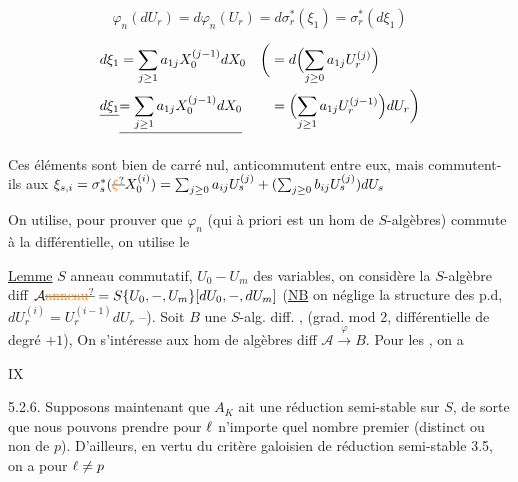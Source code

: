 \[
\varphi_n(dU_r)=d\varphi_n(U_r)=d\sigma_r^*(\xi_1)=\sigma_r^*(d\xi_1)
\]

\[
\begin{aligned}
 d\xi_1&=\sum_{j\geq1}a_{1j}X_0^{(j-1)}dX_0
 &\biggl(&=d\Bigl(\sum_{j\geq0}a_{1j}U_r^{(j)}\Bigr)\\
 \deleted{d\xi_1}&\deleted{=\sum_{j\geq1}a_{1j}X_0^{(j-1)}dX_0}
 &&=\Bigl(\sum_{j\geq1}a_{1j}U_r^{(j-1)}\Bigr)dU_r\biggr)
\end{aligned}
\]

Ces éléments sont bien de carré nul, anticommutent entre eux, mais commutent-ils aux $\xi_{s,i}=\sigma_s^*(\deleted{\unsure{\xi}}X_0^{(i)})=\sum_{j\geq0}a_{ij}U_s^{(j)}+(\sum_{j\geq0}b_{ij}U_s^{(j)})dU_s$



On utilise, pour prouver que $\varphi_n$ (qui à priori est un hom de $S$-algèbres) commute à la différentielle, on utilise le

\uline{Lemme} $S$ anneau commutatif, $U_0-U_m$ des variables, on considère la $S$-algèbre diff $\mathcal A\deleted{\unsure{\text{anneau}}}=S\{U_0,-,U_m\}[dU_0,-,dU_m]$ (\uline{NB} on néglige la structure des p.d,  $dU_r^{(i)}=U_r^{(i-1)}dU_r$ --). Soit $B$ une $S$-alg. diff. , (grad. mod 2, différentielle de degré $+1$), On s'intéresse aux hom de algèbres diff $\mathcal A\xrightarrow{\varphi} B$. Pour les , on a


\hfill IX

5.2.6. Supposons maintenant que $A_K$ ait une réduction semi-stable sur $S$, de sorte que nous pouvons prendre pour $\ell$ n'importe quel nombre premier (distinct ou non de $p$). D'ailleurs, en vertu du critère galoisien de réduction semi-stable 3.5, on a pour $\ell\ne p$

